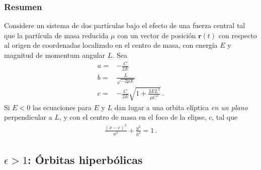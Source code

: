 \subsubsection{Resumen}

\begin{frame}
Considere un sistema de dos partículas bajo el efecto de una fuerza central tal que la partícula de masa reducida $\mu$ con un vector de posición $\mathbf{r}(t)$ con respecto al origen de coordenadas localizado en el centro de masa, con energía $E$ y magnitud de momentum angular $L$. Sea
\begin{align}
 \label{eq:aE}
  a=&-\frac{C}{2E}\nonumber\\
  b=&\frac{L}{\sqrt{-2\mu E}}\nonumber\\
  c=&-\frac{C}{2E}\sqrt{1+\frac{2EL^2}{\mu C^2}}\,.
\end{align}
Si $E<0$ las ecuaciones para $E$ y $L$ dan lugar a una orbita elíptica \emph{en un plano} perpendicular a $L$, y con el centro de masa en el foco de la elipse, $c$, tal que
\begin{align}
  \frac{(x-c)^2}{a^2}+\frac{y^2}{b^2}=1\,.
\end{align}
\end{frame}

\subsection{$\epsilon>1$: Órbitas hiperbólicas}


